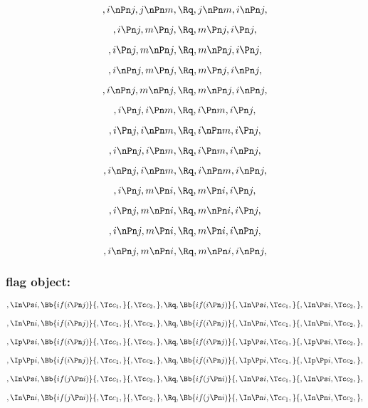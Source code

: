 \[,i \nPn j, j \nPn m, \Rq , j \nPn m, i \nPn j,\]

\bigskip
\bigskip

\[,i \Pn j, m \Pn j, \Rq , m \Pn j, i \Pn j,\]

\[,i \Pn j, m \nPn j, \Rq , m \nPn j, i \Pn j,\]

\[,i \nPn j, m \Pn j, \Rq , m \Pn j, i \nPn j,\]

\[,i \nPn j, m \nPn j, \Rq , m \nPn j, i \nPn j,\]

\bigskip
\bigskip


\[,i \Pn j, i \Pn m, \Rq , i \Pn m, i \Pn j,\]

\[,i \Pn j, i \nPn m, \Rq , i \nPn m, i \Pn j,\]

\[,i \nPn j, i \Pn m, \Rq , i \Pn m, i \nPn j,\]

\[,i \nPn j, i \nPn m, \Rq , i \nPn m, i \nPn j,\]


\bigskip
\bigskip

\[,i \Pn j, m \Pn i, \Rq , m \Pn i, i \Pn j,\]

\[,i \Pn j, m \nPn i, \Rq , m \nPn i, i \Pn j,\]

\[,i \nPn j, m \Pn i, \Rq , m \Pn i, i \nPn j,\]

\[,i \nPn j, m \nPn i, \Rq , m \nPn i, i \nPn j,\]




\bigskip
\bigskip
\bigskip
\bigskip
\subsubsection{flag object:} 
\bigskip
\bigskip
\[,\In \Ps i, \Bb{if(i \Pn j)}{,\Tc c_1,}{,\Tc c_2,}, \Rq ,\Bb{if(i \Pn j)}{,\In \Ps i, \Tc c_1,}{,\In \Ps i, \Tc c_2,},\]

\bigskip
\bigskip
\[, \In \Pn i, \Bb{if(i \Pn j)}{,\Tc c_1,}{,\Tc c_2,}, \Rq ,\Bb{if(i \Pn j)}{,\In \Pn i, \Tc c_1,}{,\In \Pn i, \Tc c_2,},\]

\bigskip
\bigskip
\[,\Ip \Ps i, \Bb{if(i \Pn j)}{,\Tc c_1,}{,\Tc c_2,}, \Rq ,\Bb{if(i \Pn j)}{,\Ip \Ps i, \Tc c_1,}{,\Ip \Ps i, \Tc c_2,},\]

\bigskip
\bigskip
\[,\Ip \Pp i, \Bb{if(i \Pn j)}{,\Tc c_1,}{,\Tc c_2,}, \Rq ,\Bb{if(i \Pn j)}{,\Ip \Pp i, \Tc c_1,}{,\Ip \Pp i, \Tc c_2,},\]

\bigskip
\bigskip
\[,\In \Ps i, \Bb{if(j \Pn i)}{,\Tc c_1,}{,\Tc c_2,}, \Rq ,\Bb{if(j \Pn i)}{,\In \Ps i, \Tc c_1,}{,\In \Ps i, \Tc c_2,},\]

\bigskip
\bigskip
\[, \In \Pn i, \Bb{if(j \Pn i)}{,\Tc c_1,}{,\Tc c_2,}, \Rq ,\Bb{if(j \Pn i)}{,\In \Pn i, \Tc c_1,}{,\In \Pn i, \Tc c_2,},\]

